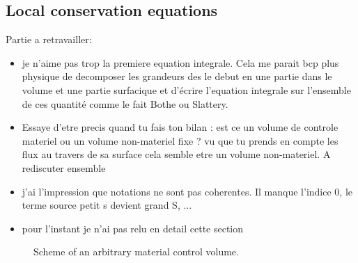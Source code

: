 \subsection{Local conservation equations}
\color{blue} 
Partie a retravailler:
\begin{itemize}
\item je n'aime pas trop la premiere equation integrale. Cela me parait bcp plus physique de decomposer les grandeurs des le debut en une partie dans le volume et une partie surfacique et d'écrire l'equation integrale sur l'ensemble de ces quantité comme le fait Bothe ou Slattery.
\item Essaye d'etre precis quand tu fais ton bilan : est ce un volume de controle materiel ou un volume non-materiel fixe ? vu que tu prends en compte les flux au travers de sa surface cela semble etre un volume non-materiel. A rediscuter ensemble
\item j'ai l'impression que notations ne sont pas coherentes. Il manque l'indice $0$, le terme source petit s devient grand S, ...
\item pour l'instant je n'ai pas relu en detail cette section
\end{itemize}
\color{black}
\begin{figure}[h]
    \centering
    \caption{Scheme of an arbitrary material control volume.   }
\end{figure}

